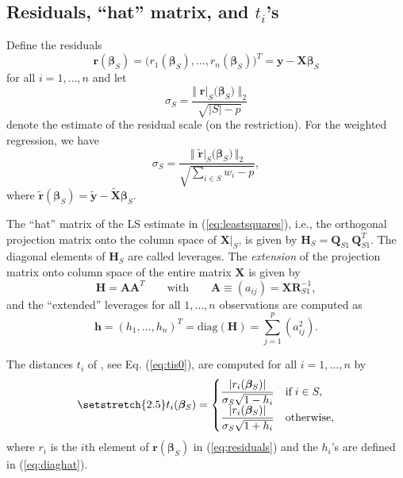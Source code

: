 \documentclass[a4paper,oneside,11pt,DIV=12]{scrartcl}
\begin{document}
\subsection{Residuals, ``hat'' matrix, and $t_i$'s}
Define the residuals
\begin{equation}\label{eq:residuals}
	\bm r(\bm \beta_S) = \big( r_1(\bm \beta_S), \ldots, r_n(\bm \beta_S) \big)^T = \bm y - \bm X \bm \beta_S
\end{equation}
\noindent for all $i = 1, \ldots, n$ and let 
\begin{equation}\label{eq:sigma}
	\sigma_S = \frac{ \big\Vert \; \bm r \vert_S \big(\bm \beta_S) \; \big\Vert_2}{\sqrt{\vert S \vert - p}} 
\end{equation}
\noindent denote the estimate of the residual scale (on the restriction). For the weighted regression, we have  
\begin{equation}
	\sigma_S = \frac{ \big\Vert \; \widetilde{\bm r} \vert_S \big(\bm \beta_S) \, \big \Vert_2}{\sqrt{ \sum_{i \in S} w_i - p}}, 
\end{equation}
\noindent where $\widetilde{\bm r}(\bm \beta_S) = \widetilde{\bm y} - \widetilde{\bm X} \bm \beta_S$.

The ``hat'' matrix of the LS estimate in (\ref{eq:leastsquares}), i.e., the orthogonal projection matrix onto the column space of $\bm X \vert_S$, is given by $\bm H_S = \bm Q_{S1} \, \bm Q_{S1}^T$. The diagonal elements of $\bm H_S$ are called leverages. The \textit{extension} of the projection matrix onto column space of the entire matrix $\bm X$ is given by 
\begin{equation*}
	\bm H = \bm A \bm A^T \qquad \text{with} \qquad \bm A \equiv (a_{ij})= \bm X \bm R_{S1}^{-1}, 
\end{equation*}
\noindent and the ``extended'' leverages for all $1, \ldots, n$ observations are computed as 
\begin{equation}\label{eq:diaghat}
	\bm h = (h_1, \ldots, h_n)^T = \mathrm{diag}(\bm H) = \sum_{j = 1}^p (a_{ij}^2).
\end{equation}

\noindent The distances $t_i$ of \citet[][p. 288]{billor_hadi_etal_2000}, see Eq. (\ref{eq:tis0}), are computed for all $i=1,\ldots,n$ by 
\begin{equation}\label{eq:tis}
	\setstretch{2.5}
	t_i(\bm \beta_S) = \begin{cases}
		\displaystyle{\frac{\vert r_i(\bm \beta_S) \vert}{\sigma_S \sqrt{1 - h_i}}} & \text{if} \; i \in S, \\
		\displaystyle{\frac{\vert r_i(\bm \beta_S) \vert}{\sigma_S \sqrt{1 + h_i}}} & \text{otherwise}, 
	\end{cases}
\end{equation}
\noindent where $r_i$ is the $i$th element of $\bm r(\bm \beta_S)$ in (\ref{eq:residuals}) and the $h_i$'s are defined in (\ref{eq:diaghat}).
\end{document}
